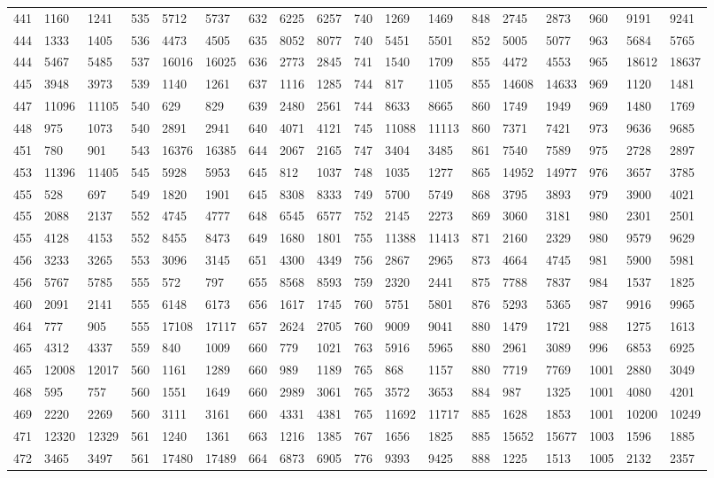 \begin{center}
\begin{longtable}{*5{A@{\hspace*{5mm}}A}}
441&1160&1241&535&5712&5737&632&6225&6257&740&1269&1469&848&2745&2873&960&9191&9241\\
444&1333&1405&536&4473&4505&635&8052&8077&740&5451&5501&852&5005&5077&963&5684&5765\\
444&5467&5485&537&16016&16025&636&2773&2845&741&1540&1709&855&4472&4553&965&18612&18637\\
445&3948&3973&539&1140&1261&637&1116&1285&744&817&1105&855&14608&14633&969&1120&1481\\
447&11096&11105&540&629&829&639&2480&2561&744&8633&8665&860&1749&1949&969&1480&1769\\
448&975&1073&540&2891&2941&640&4071&4121&745&11088&11113&860&7371&7421&973&9636&9685\\
451&780&901&543&16376&16385&644&2067&2165&747&3404&3485&861&7540&7589&975&2728&2897\\
453&11396&11405&545&5928&5953&645&812&1037&748&1035&1277&865&14952&14977&976&3657&3785\\
455&528&697&549&1820&1901&645&8308&8333&749&5700&5749&868&3795&3893&979&3900&4021\\
455&2088&2137&552&4745&4777&648&6545&6577&752&2145&2273&869&3060&3181&980&2301&2501\\
455&4128&4153&552&8455&8473&649&1680&1801&755&11388&11413&871&2160&2329&980&9579&9629\\
456&3233&3265&553&3096&3145&651&4300&4349&756&2867&2965&873&4664&4745&981&5900&5981\\
456&5767&5785&555&572&797&655&8568&8593&759&2320&2441&875&7788&7837&984&1537&1825\\
460&2091&2141&555&6148&6173&656&1617&1745&760&5751&5801&876&5293&5365&987&9916&9965\\
464&777&905&555&17108&17117&657&2624&2705&760&9009&9041&880&1479&1721&988&1275&1613\\
465&4312&4337&559&840&1009&660&779&1021&763&5916&5965&880&2961&3089&996&6853&6925\\
465&12008&12017&560&1161&1289&660&989&1189&765&868&1157&880&7719&7769&1001&2880&3049\\
468&595&757&560&1551&1649&660&2989&3061&765&3572&3653&884&987&1325&1001&4080&4201\\
469&2220&2269&560&3111&3161&660&4331&4381&765&11692&11717&885&1628&1853&1001&10200&10249\\
471&12320&12329&561&1240&1361&663&1216&1385&767&1656&1825&885&15652&15677&1003&1596&1885\\
472&3465&3497&561&17480&17489&664&6873&6905&776&9393&9425&888&1225&1513&1005&2132&2357\\

\end{longtable}
\end{center}
